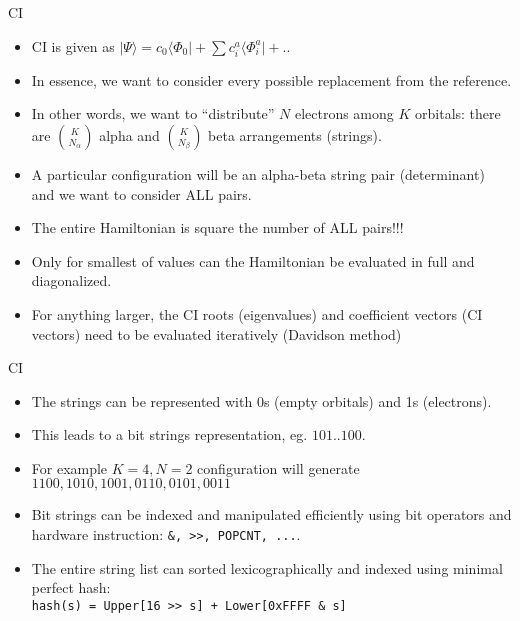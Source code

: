 \documentclass{beamer}
\newcommand{\bra}[1]{\langle #1|}
\newcommand{\ket}[1]{|#1\rangle}
\begin{document}
\begin{frame}{CI}
\begin{itemize}
\item CI is given as $\ket{\Psi} = c_0 \bra{\Phi_0} + \sum{c_i^a \bra{\Phi_i^a} } +  ..$
\item In essence, we want to consider every possible replacement from the reference.
\item In other words, we want to ``distribute'' $N$ electrons among $K$ orbitals:
 there are ${K \choose N_\alpha}$ alpha and ${K \choose N_\beta}$ beta arrangements (strings).
\item A particular configuration will be an alpha-beta string pair (determinant) and we want to consider ALL pairs.
\item The entire Hamiltonian is square the number of ALL pairs!!!
\item Only for smallest of values can the Hamiltonian be evaluated in full and diagonalized.
\item For anything larger, the CI roots (eigenvalues) and coefficient vectors (CI vectors)
  need to be evaluated iteratively (Davidson method)
\end{itemize}
\end{frame}

\begin{frame}{CI}
\begin{itemize}
\item The strings can be represented with 0s (empty orbitals) and 1s (electrons).
\item This leads to a bit strings representation, eg. $101 .. 100$.
\item For example $K = 4, N = 2$ configuration will generate $1100, 1010, 1001, 0110, 0101, 0011$
\item Bit strings can be indexed and manipulated efficiently using bit operators and hardware instruction: {\tt \&, >>, POPCNT, ...}.
\item The entire string list can sorted lexicographically and indexed using minimal perfect hash: \\
  {\tt hash(s) = Upper[16 >> s] + Lower[0xFFFF  \& s]}
\end{itemize}
\end{frame}
\end{document}
